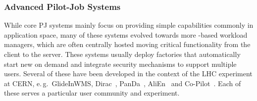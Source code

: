 \documentclass{sig-alternate}
\begin{document}



\subsubsection*{Advanced Pilot-Job Systems}



 

While core PJ systems mainly focus on providing simple \pilot capabilities 
commonly in application space, many of these systems evolved towards more 
\pilot-based workload managers, which are often centrally hosted moving 
critical functionality from the client to the server. These systems usually 
deploy \pilot factories that automatically start new \pilots on demand and 
integrate security mechanisms to support multiple users. Several of these have 
been developed in the context of the LHC experiment at CERN, e.\,g.\ 
GlideInWMS, Dirac~\cite{1742-6596-219-6-062049}, 
PanDa~\cite{1742-6596-331-7-072069}, AliEn~\cite{1742-6596-119-6-062012} and 
Co-Pilot~\cite{copilot-tr}. Each of these \pilots serves a particular user 
community and experiment.
\end{document}

